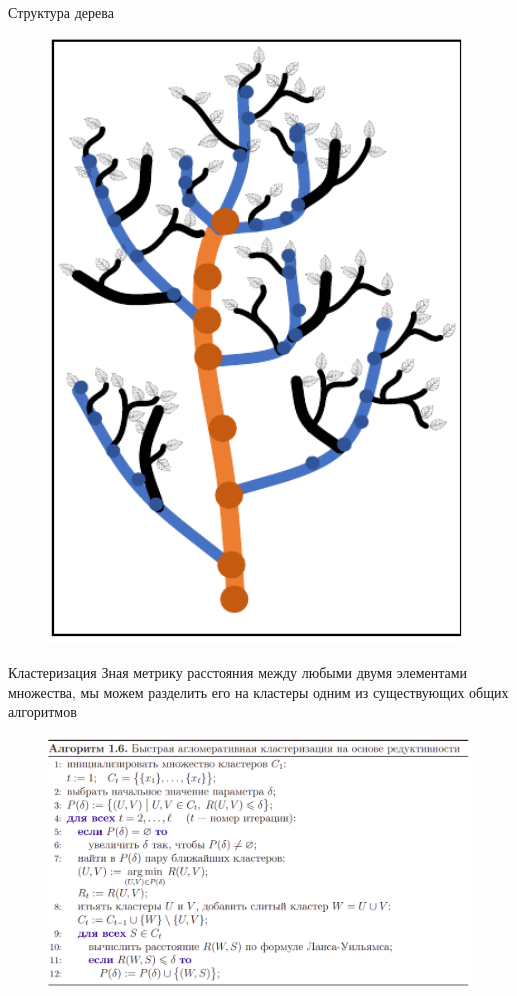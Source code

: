 \documentclass[14pt]{beamer}
\begin{document}
\begin{frame}{Структура дерева}
\begin{figure}[hbtp]
\includegraphics[scale=0.315]{tree_structure.png}
\end{figure}
\end{frame}

\begin{frame}{Кластеризация}
Зная метрику расстояния между любыми двумя элементами множества, мы можем
разделить его на кластеры одним из существующих общих алгоритмов 
\begin{figure}[hbtp]
\includegraphics[scale=0.2]{c1.png}
\end{figure}
\end{frame}
\end{document}
